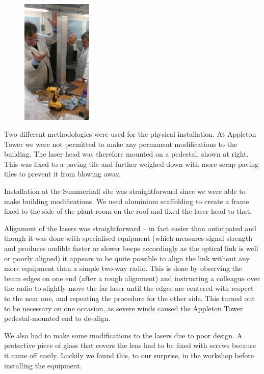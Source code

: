 \documentclass{amsart}
\begin{document}
\begin{figure}
  \includegraphics[angle=-90,width=0.3\textwidth]{tada}
\end{figure}
Two different methodologies were used for the physical
installation. At Appleton Tower we were not permitted to make any
permanent modifications to the building. The laser head was therefore
mounted on a pedestal, shown at right. This was fixed to a paving tile
and further weighed down with more scrap paving tiles to prevent it
from blowing away.

Installation at the Summerhall site was straightforward since we were
able to make building modifications. We used aluminium scaffolding to
create a frame fixed to the side of the plant room on the roof and
fixed the laser head to that.

Alignment of the lasers was straightforward -- in fact easier than
anticipated and though it was done with specialised equipment (which
measures signal strength and produces audible faster or slower beeps
accordingly as the optical link is well or poorly aligned) it appears
to be quite possible to align the link without any more equipment than
a simple two-way radio. This is done by observing the beam edges on
one end (after a rough alignment) and instructing a colleague over the
radio to slightly move the far laser until the edges are centered with
respect to the near one, and repeating the procedure for the other
side. This turned out to be necessary on one occasion, as severe winds caused the
Appleton Tower pedestal-mounted end to de-align.

We also had to make some modifications to the lasers due to poor
design. A protective piece of glass that covers the lens had to be
fixed with screws because it came off easily. Luckily we found this,
to our surprise, in the workshop before installing the equipment.
\end{document}
